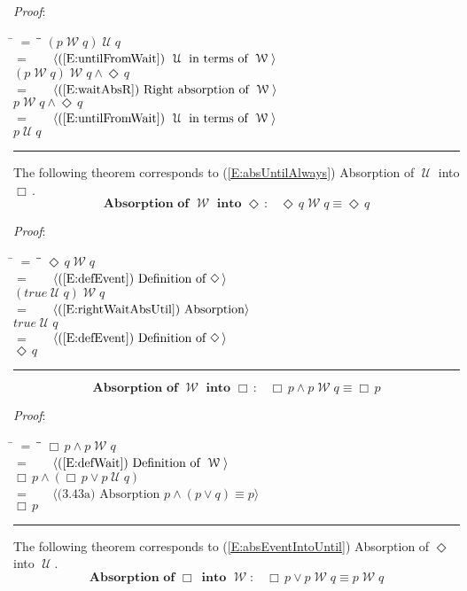 \documentclass[12pt, fleqn, leqno]{article}
\newcommand{\lgap}{2pt}                             %
\newcommand{\mymathindent}{24pt}                    %
\newcommand{\Until}{\;\mathcal{U}\;}
\newcommand{\Wait}{\;\mathcal{W}\;}
\newcommand{\Event}{\Diamond\,}
\newcommand{\Always}{\Box\,}
\newcommand{\myqed}{\rule[-.23ex]{1.2ex}{2.0ex}}
\newcommand{\myqedtab}{\hspace{384pt}}              %
\newcommand{\Gll} {\langle}                         %
\newcommand{\Ggg} {\rangle}                         %
\newcommand{\Hint}[1]     {\ \ \ $\Gll              \mbox{#1} \Ggg$ }   %
\begin{document}
\emph{Proof}:
\begin{tabbing}
\hspace{\mymathindent} \= $= \;$ \= \myqedtab \= \kill
\> \> $(p \Wait q) \Until q$\\[\lgap]
\> $=$ \> \Hint{(\ref{E:untilFromWait}) $\Until$ in terms of $\Wait$} \\[\lgap]
\> \> $(p \Wait q) \Wait q \land \Event q$\\[\lgap]
\> $=$ \> \Hint{(\ref{E:waitAbsR}) Right absorption of $\Wait$} \\[\lgap]
\> \> $p \Wait q \land \Event q$\\[\lgap]
\> $=$ \> \Hint{(\ref{E:untilFromWait}) $\Until$ in terms of $\Wait$} \\[\lgap]
\> \> $p \Until q$ \quad \myqed
\end{tabbing}

The following theorem corresponds to (\ref{E:absUntilAlways}) Absorption of $\Until$ into $\Always$.
\begin{equation}\label{E:absorpEventWait}
\textbf{Absorption of $\Wait$ into $\Event$:}\quad \Event q \Wait q \equiv \Event q
\end{equation}

\emph{Proof}:
\begin{tabbing}
\hspace{\mymathindent} \= $= \;$ \= \myqedtab \= \kill
\> \> $\Event q \Wait q$\\[\lgap]
\> $=$  \>  \Hint{(\ref{E:defEvent}) Definition of $\Event$}\\[\lgap]
\> \> $(true\Until q) \Wait q$\\[\lgap]
\> $=$  \>  \Hint{(\ref{E:rightWaitAbsUtil}) Absorption}\\[\lgap]
\> \> $true\Until q$\\[\lgap]
\> $=$  \>  \Hint{(\ref{E:defEvent}) Definition of $\Event$}\\[\lgap]
\> \> $\Event q$ \quad \myqed
\end{tabbing}
\begin{equation}\label{E:absWaitAlways}
\textbf{Absorption of $\Wait$ into $\Always$:}\quad \Always p\land p\Wait q\equiv \Always p
\end{equation}

\emph{Proof}:
\begin{tabbing}
\hspace{\mymathindent} \= $= \;$ \= \myqedtab \= \kill
\> \> $\Always p\land p\Wait q$\\[\lgap]
\> $=$ \> \Hint{(\ref{E:defWait}) Definition of $\Wait$} \\[\lgap]
\> \> $\Always p\land (\Always p\lor p\Until q)$\\[\lgap]
\> $=$ \> \Hint{(3.43a) Absorption $p\land (p\lor q) \equiv p$} \\[\lgap]
\> \> $\Always p$ \quad \myqed
\end{tabbing}
The following theorem corresponds to (\ref{E:absEventIntoUntil}) Absorption of $\Event$ into $\Until$. 
\begin{equation}\label{E:absAlwaysWait}
\textbf{Absorption of $\Always$ into $\Wait$:}\quad \Always p\lor p\Wait q\equiv p\Wait q
\end{equation}
\end{document}
